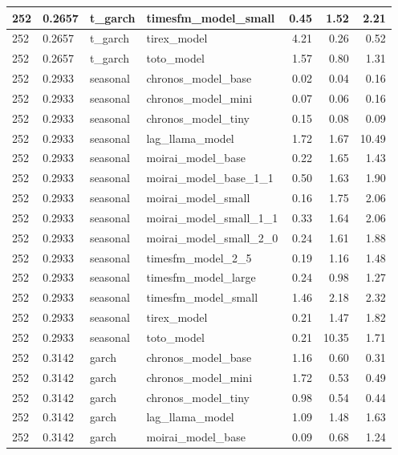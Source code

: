 {\begin{tabular}{llllrrr}
\midrule
252 & 0.2657 & t\_garch & timesfm\_model\_small & 0.45 & 1.52 & 2.21 \\
\midrule
252 & 0.2657 & t\_garch & tirex\_model & 4.21 & 0.26 & 0.52 \\
\midrule
252 & 0.2657 & t\_garch & toto\_model & 1.57 & 0.80 & 1.31 \\
\midrule
252 & 0.2933 & seasonal & chronos\_model\_base & 0.02 & 0.04 & 0.16 \\
\midrule
252 & 0.2933 & seasonal & chronos\_model\_mini & 0.07 & 0.06 & 0.16 \\
\midrule
252 & 0.2933 & seasonal & chronos\_model\_tiny & 0.15 & 0.08 & 0.09 \\
\midrule
252 & 0.2933 & seasonal & lag\_llama\_model & 1.72 & 1.67 & 10.49 \\
\midrule
252 & 0.2933 & seasonal & moirai\_model\_base & 0.22 & 1.65 & 1.43 \\
\midrule
252 & 0.2933 & seasonal & moirai\_model\_base\_1\_1 & 0.50 & 1.63 & 1.90 \\
\midrule
252 & 0.2933 & seasonal & moirai\_model\_small & 0.16 & 1.75 & 2.06 \\
\midrule
252 & 0.2933 & seasonal & moirai\_model\_small\_1\_1 & 0.33 & 1.64 & 2.06 \\
\midrule
252 & 0.2933 & seasonal & moirai\_model\_small\_2\_0 & 0.24 & 1.61 & 1.88 \\
\midrule
252 & 0.2933 & seasonal & timesfm\_model\_2\_5 & 0.19 & 1.16 & 1.48 \\
\midrule
252 & 0.2933 & seasonal & timesfm\_model\_large & 0.24 & 0.98 & 1.27 \\
\midrule
252 & 0.2933 & seasonal & timesfm\_model\_small & 1.46 & 2.18 & 2.32 \\
\midrule
252 & 0.2933 & seasonal & tirex\_model & 0.21 & 1.47 & 1.82 \\
\midrule
252 & 0.2933 & seasonal & toto\_model & 0.21 & 10.35 & 1.71 \\
\midrule
252 & 0.3142 & garch & chronos\_model\_base & 1.16 & 0.60 & 0.31 \\
\midrule
252 & 0.3142 & garch & chronos\_model\_mini & 1.72 & 0.53 & 0.49 \\
\midrule
252 & 0.3142 & garch & chronos\_model\_tiny & 0.98 & 0.54 & 0.44 \\
\midrule
252 & 0.3142 & garch & lag\_llama\_model & 1.09 & 1.48 & 1.63 \\
\midrule
252 & 0.3142 & garch & moirai\_model\_base & 0.09 & 0.68 & 1.24 \\

\end{tabular}}
